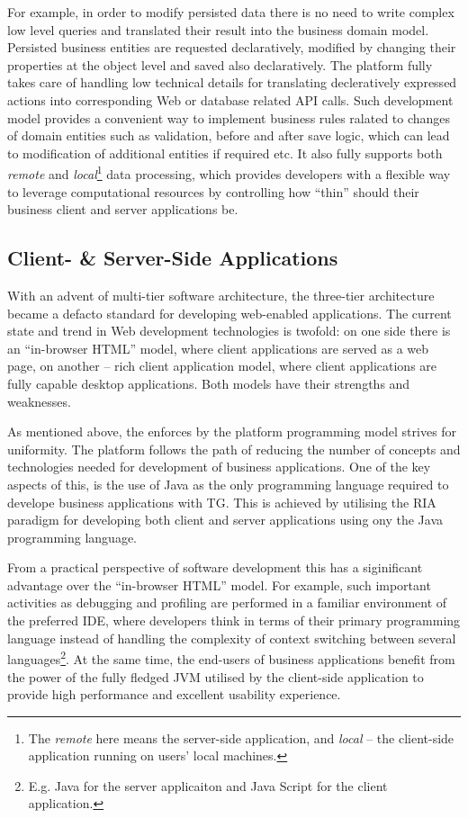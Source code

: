   For example, in order to modify persisted data there is no need to write complex low level queries and translated their result into the business domain model.
  Persisted business entities are requested declaratively, modified by changing their properties at the object level and saved also declaratively.
  The platform fully takes care of handling low technical details for translating decleratively expressed actions into corresponding Web or database related API calls.
  Such development model provides a convenient way to implement business rules ralated to changes of domain entities such as validation, before and after save logic, which can lead to modification of additional entities if required etc.
  It also fully supports both \emph{remote} and \emph{local}\footnote{The \emph{remote} here means the server-side application, and \emph{local} -- the client-side application running on users' local machines.} data processing, which provides developers with a flexible way to leverage computational resources by controlling how ``thin'' should their business client and server applications be.

  \subsection{Client- \& Server-Side Applications}
  With an advent of multi-tier software architecture, the three-tier architecture became a defacto standard for developing web-enabled applications.
  The current state and trend in Web development technologies is twofold: on one side there is an ``in-browser HTML'' model, where client applications are served as a web page, on another -- rich client application model, where client applications are fully capable desktop applications.
  Both models have their strengths and weaknesses.

  As mentioned above, the enforces by the platform programming model strives for uniformity. 
  The platform follows the path of reducing the number of concepts and technologies needed for development of business applications.
  One of the key aspects of this, is the use of Java as the only programming language required to develope business applications with TG.
  This is achieved by utilising the RIA paradigm for developing both client and server applications using ony the Java programming language.
  
  From a practical perspective of software development this has a siginificant advantage over the ``in-browser HTML'' model.  
  For example, such important activities as debugging and profiling are performed in a familiar environment of the preferred IDE, where developers think in terms of their primary programming language instead of handling the complexity of context switching between several languages\footnote{E.g. Java for the server applicaiton and Java Script for the client application.}.
  At the same time, the end-users of business applications benefit from the power of the fully fledged JVM utilised by the client-side application to provide high performance and excellent usability experience.
  
